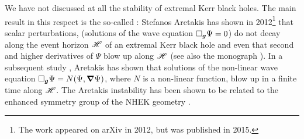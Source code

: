 We have not discussed at all the stability of extremal Kerr black holes.
The main result in this respect is the so-called : Stefanos Aretakis has shown in 2012\footnote{The work \cite{Areta15} appeared
on arXiv in 2012, but was published in 2015.} that scalar perturbations,
(solutions of the wave equation $\Box_{\bm{g}} \Psi = 0$)
do not decay along the event horizon $\mathscr{H}$ of an extremal Kerr black hole
and even that second and higher derivatives of $\Psi$ blow
up along $\mathscr{H}$ \cite{Areta15}
(see also the monograph \cite{Areta18}). In a subsequent study \cite{Areta13},
Aretakis has shown that solutions of the non-linear wave equation $\Box_{\bm{g}}\Psi = N(\Psi,\bm{\nabla}\Psi)$, where  $N$ is a non-linear function,
blow up in a finite time along $\mathscr{H}$.
The Aretakis instability has been shown to be related to the
enhanced symmetry group of the NHEK geometry \cite{GrallZ18}.







